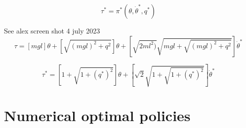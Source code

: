 \begin{equation}
\tau^*
=
\pi^* \left(
 \theta, \dot{\theta}^* ,
 q^* 
\right)
\end{equation}


See alex screen shot 4 july 2023
\begin{equation}
\tau = 
\left[
mgl \right] \theta
+
\left[
\sqrt{ (mgl)^2 + q^2} \right] \theta
+
\left[
\sqrt{ 2 ml^2)} \sqrt{mgl+ \sqrt{ (mgl)^2 + q^2}}
\right] \dot{\theta}^*
\end{equation}

\begin{equation}
\tau^* = 
\left[
1 + \sqrt{ 1 + (q^*)^2}
\right] \theta
+
\left[
\sqrt{2} \sqrt{ 1 + \sqrt{ 1 + (q^*)^2}}
\right] \dot{\theta}^*
\end{equation}


\newpage
\section{Numerical optimal policies}

